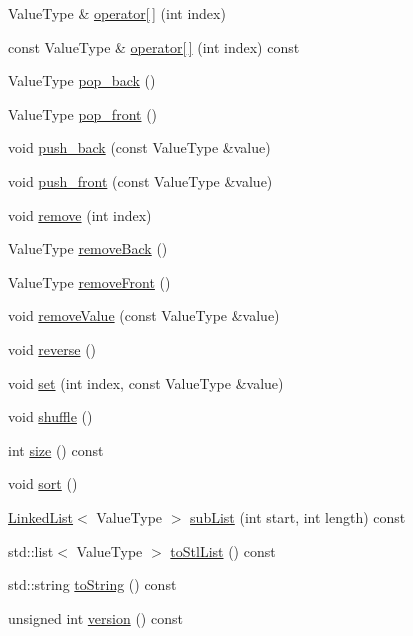 \begin{DoxyCompactItemize}
\item 
Value\+Type \& \mbox{\hyperlink{classLinkedList_a7dbb3a92c8b6a08a04b564aed136b870}{operator\mbox{[}$\,$\mbox{]}}} (int index)
\item 
const Value\+Type \& \mbox{\hyperlink{classLinkedList_a1b5a4ea461655cbe512ab976aad8d809}{operator\mbox{[}$\,$\mbox{]}}} (int index) const
\item 
Value\+Type \mbox{\hyperlink{classLinkedList_ab48f65e37130b674bc0f6220cbb59491}{pop\+\_\+back}} ()
\item 
Value\+Type \mbox{\hyperlink{classLinkedList_aacdba74afa1be07d1046ece9e0512c77}{pop\+\_\+front}} ()
\item 
void \mbox{\hyperlink{classLinkedList_a8ff6f18ca45e769f2f8c7a0bcf79fad9}{push\+\_\+back}} (const Value\+Type \&value)
\item 
void \mbox{\hyperlink{classLinkedList_a9737dc314198d1cf306325134f000c5a}{push\+\_\+front}} (const Value\+Type \&value)
\item 
void \mbox{\hyperlink{classLinkedList_a2ad1aa316f278b2e9fa8121504749652}{remove}} (int index)
\item 
Value\+Type \mbox{\hyperlink{classLinkedList_af7878e9c2f67e06cbae525e9fa77e38e}{remove\+Back}} ()
\item 
Value\+Type \mbox{\hyperlink{classLinkedList_a02453aa96e93c38ca4c1d176307c8a63}{remove\+Front}} ()
\item 
void \mbox{\hyperlink{classLinkedList_a10e8154a489093d2b1f20596342bcd78}{remove\+Value}} (const Value\+Type \&value)
\item 
void \mbox{\hyperlink{classLinkedList_a310c0bebc002158f5646a91d60e4dc89}{reverse}} ()
\item 
void \mbox{\hyperlink{classLinkedList_a004ea6d6bc4a512ce4d52962727d5db2}{set}} (int index, const Value\+Type \&value)
\item 
void \mbox{\hyperlink{classLinkedList_a1905fe84eb39f020b32c58baf7a76758}{shuffle}} ()
\item 
int \mbox{\hyperlink{classLinkedList_af9593d4a5ff4274efaf429cb4f9e57cc}{size}} () const
\item 
void \mbox{\hyperlink{classLinkedList_a47fdc9eea42b6975cdc835bb2e08810e}{sort}} ()
\item 
\mbox{\hyperlink{classLinkedList}{Linked\+List}}$<$ Value\+Type $>$ \mbox{\hyperlink{classLinkedList_a1524b4e899bf6d7b9db87243f3be0c1b}{sub\+List}} (int start, int length) const
\item 
std\+::list$<$ Value\+Type $>$ \mbox{\hyperlink{classLinkedList_acaacac140f8ee61f1d0d8ecc94b6b95e}{to\+Stl\+List}} () const
\item 
std\+::string \mbox{\hyperlink{classLinkedList_a1fe5121d6528fdea3f243321b3fa3a49}{to\+String}} () const
\item 
unsigned int \mbox{\hyperlink{classLinkedList_a0aa696ccb72cbf928535d6b646bac1aa}{version}} () const
\end{DoxyCompactItemize}


